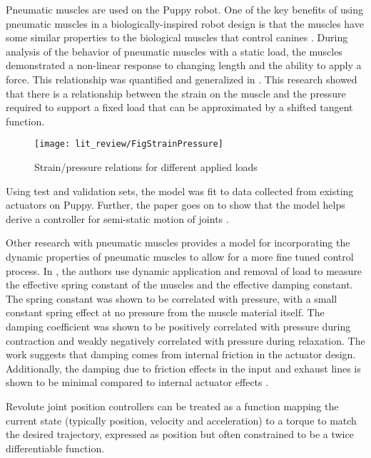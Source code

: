 Pneumatic muscles are used on the Puppy robot. One of the key
benefits of using pneumatic muscles in a biologically-inspired robot design is
that the muscles have some similar properties to the biological muscles that control
canines \cite{Tavakoli2008}.
During analysis of the behavior of pneumatic muscles with a static load, the muscles demonstrated a non-linear response to
changing length and the ability to apply a force. This relationship was
quantified and generalized in \cite{HuntPMuscles}. This research showed that
there is a relationship between the strain on the muscle and the pressure
required to support a fixed load that can be approximated by a shifted tangent
function. 

\begin{figure}[h!]
\centering
\texttt{[image: lit\_review/FigStrainPressure]}
\caption{Strain/pressure relations for different applied loads}
\label{fig:StrainPressure}
\end{figure}

Using test and validation sets, the model was fit to data collected
from existing actuators on Puppy. Further, the paper goes on to show that the
model helps derive a controller for semi-static motion of joints \cite{HuntPMuscles}.

Other research with pneumatic muscles provides a model for incorporating the
dynamic properties of pneumatic muscles to allow for a more fine tuned control
process. In \cite{DynamicPMuscles}, the authors use dynamic application and
removal of load to measure the effective spring constant of the muscles and the
effective damping constant. The spring constant was shown to be correlated with
pressure, with a small constant spring effect at no pressure from the muscle
material itself. The damping coefficient was shown to be positively correlated
with pressure during contraction and weakly negatively correlated with pressure
during relaxation. The work suggests that damping comes from internal
friction in the actuator design. Additionally, the damping due to friction
effects in the input and exhaust lines is shown to be minimal compared to
internal actuator effects \cite{DynamicPMuscles}.



Revolute joint position controllers can be treated as a function mapping the current
state (typically position, velocity and acceleration) to a torque to match the 
desired trajectory, expressed as position but often constrained to be a twice
differentiable function.


